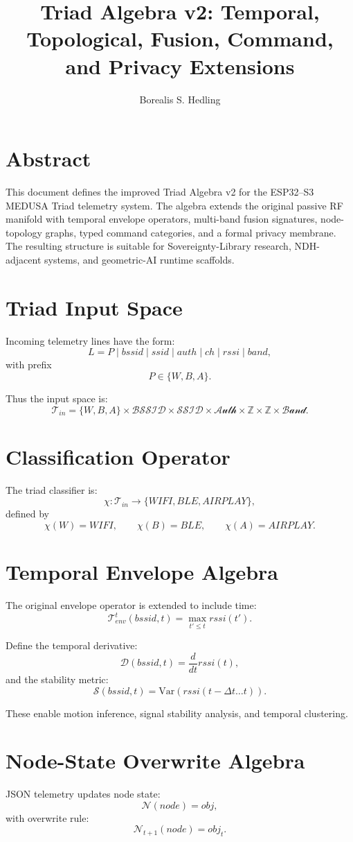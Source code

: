 \documentclass[11pt]{article}
\title{Triad Algebra v2: Temporal, Topological, Fusion, Command, and Privacy Extensions}
\author{Borealis S. Hedling}
\date{}
\begin{document}
\maketitle

\section*{Abstract}
This document defines the improved Triad Algebra v2 for the ESP32--S3 MEDUSA Triad
telemetry system. The algebra extends the original passive RF manifold with temporal
envelope operators, multi-band fusion signatures, node-topology graphs, typed command
categories, and a formal privacy membrane. The resulting structure is suitable for
Sovereignty-Library research, NDH-adjacent systems, and geometric-AI runtime scaffolds.

\section{Triad Input Space}
Incoming telemetry lines have the form:
\[
L = P \mid bssid \mid ssid \mid auth \mid ch \mid rssi \mid band,
\]
with prefix
\[
P \in \{W, B, A\}.
\]

Thus the input space is:
\[
\mathcal{T}_{in}
= \{W,B,A\}
\times \mathcal{BSSID}
\times \mathcal{SSID}
\times \mathcal{Auth}
\times \mathbb{Z}
\times \mathbb{Z}
\times \mathcal{Band}.
\]

\section{Classification Operator}
The triad classifier is:
\[
\chi : \mathcal{T}_{in} \to \{WIFI, BLE, AIRPLAY\},
\]
defined by
\[
\chi(W)=WIFI,\qquad
\chi(B)=BLE,\qquad
\chi(A)=AIRPLAY.
\]

\section{Temporal Envelope Algebra}
The original envelope operator is extended to include time:
\[
\mathcal{T}_{env}^{t}(bssid,t)
= \max_{t' \le t} rssi(t').
\]

Define the temporal derivative:
\[
\mathcal{D}(bssid,t) = \frac{d}{dt} rssi(t),
\]
and the stability metric:
\[
\mathcal{S}(bssid,t) = \mathrm{Var}(rssi(t-\Delta t \ldots t)).
\]

These enable motion inference, signal stability analysis, and temporal clustering.

\section{Node-State Overwrite Algebra}
JSON telemetry updates node state:
\[
\mathcal{N}(node) = obj,
\]
with overwrite rule:
\[
\mathcal{N}_{t+1}(node) = obj_t.
\]
\end{document}
